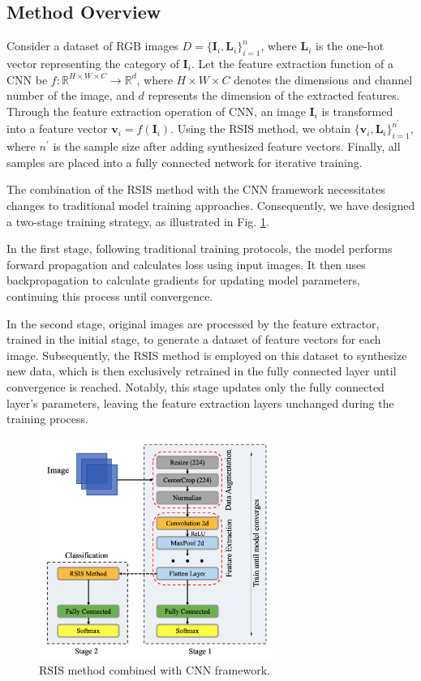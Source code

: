 \documentclass[lettersize,journal]{IEEEtran}
\begin{document}
\subsection{Method Overview}
Consider a dataset of RGB images $D=\{\boldsymbol{I}_i,\boldsymbol{L}_i \}_
{i=1}^n$, where $\boldsymbol{L}_i$ is the one-hot vector representing the category of $\boldsymbol{I}_i$. Let the feature extraction function of a CNN be 
$f:\mathbb{R}^{H\times W\times C}\rightarrow \mathbb{R}^d$, 
where $H\times W\times C$ denotes the dimensions and channel 
number of the image, and $d$ represents the dimension of the 
extracted features. Through the feature extraction operation of 
CNN, an image $\boldsymbol{I}_i$ is transformed into a feature 
vector $\boldsymbol{v}_i=f(\boldsymbol{I}_i)$. Using the RSIS 
method, we obtain $\{\boldsymbol{v}_i,\boldsymbol{L}_i\}_{i=1}^{n^\prime}$, 
where $n^\prime$ is the sample size after adding synthesized 
feature vectors. Finally, all samples are placed into a fully 
connected network for iterative training. 

The combination of the RSIS method with the CNN framework 
necessitates changes to traditional model training approaches. 
Consequently, we have designed a two-stage training strategy, as 
illustrated in Fig. \ref{Fig7}.

In the first stage, following traditional training protocols, 
the model performs forward propagation and calculates loss using 
input images. It then uses backpropagation to calculate gradients 
for updating model parameters, continuing this process until 
convergence.

In the second stage, original images are processed by the feature 
extractor, trained in the initial stage, to generate a dataset of 
feature vectors for each image. Subsequently, the RSIS method is 
employed on this dataset to synthesize new data, which is then 
exclusively retrained in the fully connected layer until 
convergence is reached. Notably, this stage updates only the 
fully connected layer's parameters, leaving the feature extraction 
layers unchanged during the training process.

\begin{figure}[!t]
  \centering
  \includegraphics[width=3.0in]{Fig7.png}
  \caption{RSIS method combined with CNN framework.}
  \label{Fig7}
\end{figure}
\end{document}
